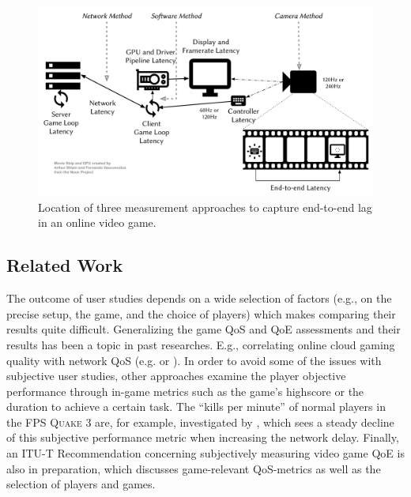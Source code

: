 \begin{figure}[!t]
    \centering
    \includegraphics[width=1.0\columnwidth]{../../models/e2e-lag.pdf}
    \caption{Location of three measurement approaches to capture end-to-end lag in an online video game.}
\label{fig:measurement-methods}
\end{figure}


\subsection{Related Work}

The outcome of user studies depends on a wide selection of factors (e.g., on the precise setup, the game, and the choice of players) which makes comparing their results quite difficult. Generalizing the game \acrshort{QoS} and \gls{QoE} assessments and their results has been a topic in past researches. E.g., correlating online cloud gaming quality with network \acrshort{QoS} (e.g. \cite{5976180} or \cite{6614351}). In order to avoid some of the issues with subjective user studies, other approaches examine the player objective performance through in-game metrics such as the game's highscore or the duration to achieve a certain task. The ``kills per minute'' of normal players in the \gls{FPS} \textsc{Quake 3} are, for example, investigated by \cite{1266180}, which sees a steady decline of this subjective performance metric when increasing the network delay. Finally, an ITU-T Recommendation \cite{mollertowards} concerning subjectively measuring video game \gls{QoE} is also in preparation, which discusses game-relevant \gls{QoS}-metrics as well as the selection of players and games.
